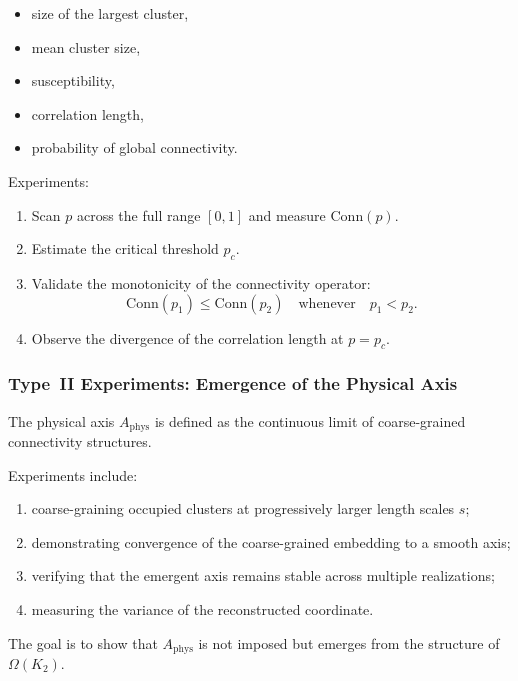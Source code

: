 \begin{itemize}
    \item size of the largest cluster,
    \item mean cluster size,
    \item susceptibility,
    \item correlation length,
    \item probability of global connectivity.
\end{itemize}

Experiments:

\begin{enumerate}
    \item Scan $p$ across the full range $[0,1]$ and measure $\mathrm{Conn}(p)$.
    \item Estimate the critical threshold $p_c$.
    \item Validate the monotonicity of the connectivity operator:
          \[
             \mathrm{Conn}(p_1) \le \mathrm{Conn}(p_2)
             \quad \text{whenever} \quad p_1 < p_2.
          \]
    \item Observe the divergence of the correlation length at $p = p_c$.
\end{enumerate}



\subsubsection{Type~II Experiments: Emergence of the Physical Axis}

The physical axis $A_{\mathrm{phys}}$ is defined as the continuous limit of 
coarse-grained connectivity structures.

Experiments include:

\begin{enumerate}
    \item coarse-graining occupied clusters at progressively larger length 
          scales $s$;
    \item demonstrating convergence of the coarse-grained embedding to a 
          smooth axis;
    \item verifying that the emergent axis remains stable across multiple 
          realizations;
    \item measuring the variance of the reconstructed coordinate.
\end{enumerate}

The goal is to show that $A_{\mathrm{phys}}$ is not imposed but emerges 
from the structure of $\Omega(K_2)$.




